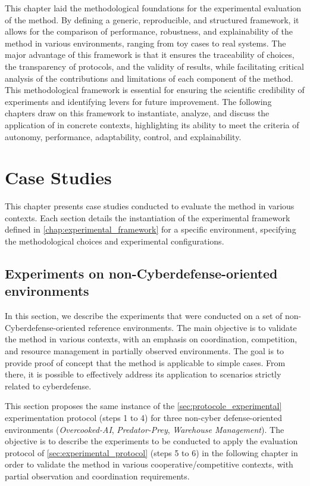This chapter laid the methodological foundations for the experimental evaluation of the  method. By defining a generic, reproducible, and structured framework, it allows for the comparison of performance, robustness, and explainability of the method in various environments, ranging from toy cases to real systems. The major advantage of this framework is that it ensures the traceability of choices, the transparency of protocols, and the validity of results, while facilitating critical analysis of the contributions and limitations of each component of the method. This methodological framework is essential for ensuring the scientific credibility of experiments and identifying levers for future improvement. The following chapters draw on this framework to instantiate, analyze, and discuss the application of  in concrete contexts, highlighting its ability to meet the criteria of autonomy, performance, adaptability, control, and explainability.


\clearpage
\thispagestyle{empty}
\null
\newpage


\chapter{Case Studies}
\label{chap:case_studies}

This chapter presents case studies conducted to evaluate the  method in various contexts. Each section details the instantiation of the experimental framework defined in \autoref {chap:experimental_framework} for a specific environment, specifying the methodological choices and experimental configurations.

\section{Experiments on non-Cyberdefense-oriented environments}

In this section, we describe the experiments that were conducted on a set of non-Cyberdefense-oriented reference environments. The main objective is to validate the  method in various contexts, with an emphasis on coordination, competition, and resource management in partially observed environments. The goal is to provide proof of concept that the  method is applicable to simple cases. From there, it is possible to effectively address its application to scenarios strictly related to cyberdefense.

This section proposes the same instance of the \autoref{sec:protocole_experimental} experimentation protocol (steps 1 to 4) for three non-cyber defense-oriented environments (\textit{Overcooked-AI}, \textit{Predator-Prey}, \textit{Warehouse Management}).
The objective is to describe the experiments to be conducted to apply the evaluation protocol of \autoref{sec:experimental_protocol} (steps 5 to 6) in the following chapter in order to validate the  method in various cooperative/competitive contexts, with partial observation and coordination requirements.


